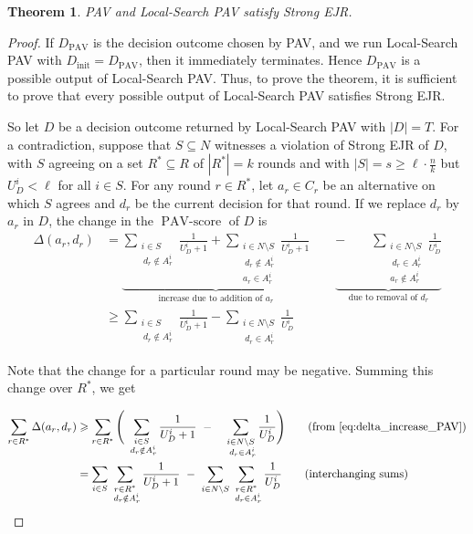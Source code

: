 \documentclass[10pt]{scrartcl}
\theoremstyle{plain}
\newtheorem{theorem}{Theorem}[section]
\theoremstyle{definition}
\renewcommand*{\ge}{\geqslant}
\begin{document}
\begin{theorem}
	PAV and Local-Search PAV satisfy Strong EJR.
\end{theorem}

\begin{proof}
	If $D_{\text{PAV}}$ is the decision outcome chosen by PAV, and we run Local-Search PAV with $D_{\text{init}} = D_{\text{PAV}}$, then it immediately terminates. Hence $D_{\text{PAV}}$ is a possible output of Local-Search PAV. Thus, to prove the theorem, it is sufficient to prove that every possible output of Local-Search PAV satisfies Strong EJR.
	
	So let $D$ be a decision outcome returned by Local-Search PAV with $|D| = T$. 
	For a contradiction, suppose that $S \subseteq N$ witnesses a violation of Strong EJR of $D$, with $S$ agreeing on a set $R^* \subseteq R$ of $|R^*| = k$ rounds and with $|S| = s \ge \ell \cdot \frac{n}{k}$ but $U^i_D < \ell$ for all $i \in S$. 
	For any round $r \in R^*$, let $a_r \in C_r$ be an alternative on which $S$ agrees and $d_r$ be the current decision for that round.
	If we replace $d_r$ by $a_r$ in $D$, the change in the $\operatorname{PAV-score}$ of $D$ is
	\begin{align}
		\Delta(a_r, d_r) 
		&= \underbrace{ \sum_{\substack{i \in S \\ \ d_r \notin A^i_r}} \frac{1}{U^i_D + 1} + \sum_{\substack{i \in N \setminus S \\ \ d_r \notin A^i_r \\ a_r \in A^i_r}} \frac{1}{U^i_D + 1} }_{\text{increase due to addition of } a_r} 
		\qquad
		\underbrace{- \qquad \sum_{\substack{i \in N \setminus S \\ \ d_r \in A^i_r \\ a_r \notin A^i_r}} \frac{1}{U^i_D}}_{ \text{due to removal of } d_r} 
		\nonumber
		\\
		& \ge \sum_{\substack{i \in S \\ \ d_r \notin A^i_r}} \frac{1}{U^i_D + 1} - \sum_{\substack{i \in N \setminus S \\ \ d_r \in A^i_r}} \frac{1}{U^i_D}
		\label{eq:delta_increase_PAV}
	\end{align}
	
	Note that the change for a particular round may be negative. Summing this change over $R^*$, we get 
	
	\begin{align*}
		\sum_{r \in R^*}\Delta(a_r, d_r) &\ge \sum_{r \in R^*} \Bigg( \sum_{\substack{i \in S \\ \ d_r \notin A^i_r}} \frac{1}{U^i_D + 1} \ - \quad \sum_{\substack{i \in N \setminus S \\ \ d_r \in A^i_r}} \frac{1}{U^i_D} \Bigg ) \tag{from \eqref{eq:delta_increase_PAV}} \\ 
		&= \sum_{i \in S} \sum_{\substack{r \in R^* \\ \ d_r \notin A^i_r}} \frac{1}{U^i_D + 1} \ - \ \sum_{i \in N \setminus S} \sum_{\substack{r \in R^* \\ \ d_r \in A^i_r}} \frac{1}{U^i_D} \tag{interchanging  sums}  
	\end{align*}
	

\end{proof}
\end{document}

